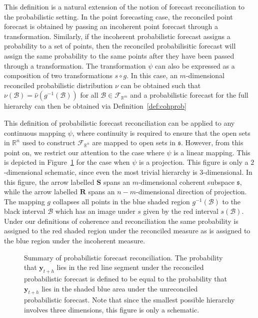 \documentclass[12pt]{article}
\theoremstyle{definition}
\begin{document}
This definition is a natural extension of the notion of forecast reconciliation to the probabilistic setting. In the point forecasting case, the reconciled point forecast is obtained by passing an incoherent point forecast through a transformation. Similarly, if the incoherent probabilistic forecast assigns a probability to a set of points, then the reconciled probabilisitic forecast will assign the same probability to the same points after they have been passed through a transformation.  The transformation $\psi$ can also be expressed as a composition of two transformations $s\circ g$.  In this case, an $m$-dimensional reconciled probabilistic distribution $\nu$ can be obtained such that $\nu(\mathcal{B})= \hat{\nu}(g^{-1}(\mathcal{B}))$ for all $\mathcal{B} \in \mathscr{F}_{\mathbb{R}^m}$ and a probabilistic forecast for the full hierarchy can then be obtained via Definition~\ref{def:cohprob}  

This definition of probabilistic forecast reconciliation can be applied to any continuous mapping $\psi$, where continuity is required to ensure that the open sets in $\mathbb{R}^n$ used to construct $\mathscr{F}_{\mathbb{R}^n}$ are mapped to open sets in $\mathfrak{s}$.  However, from this point on, we restrict our attention to the case where $\psi$ is a linear mapping.  This is depicted in Figure~\ref{fig:probfr_sch} for the case when $\psi$ is a projection.  This figure is only a $2$-dimensional schematic, since even the most trivial hierarchy is $3$-dimensional.  In this figure, the arrow labelled $\bm{S}$ spans an $m$-dimensional coherent subspace $\mathfrak{s}$, while the arrow labelled $\bm{R}$ spans an $n-m$-dimensional direction of projection.  The mapping $g$ collapses all points in the blue shaded region $g^{-1}(\mathcal{B})$ to the black interval $\mathcal{B}$ which has an image under $s$ given by the red interval $s(\mathcal{B})$.  Under our definitions of coherence and reconciliation the same probability is assigned to the red shaded region under the reconciled measure as is assigned to the blue region under the incoherent measure.

\begin{figure}
	
	\caption{Summary of probabilistic forecast reconciliation. The probability that $\bm{y}_{t+h}$ lies in the red line segment under the reconciled probabilistic forecast is defined to be equal to the probability that $\bm{y}_{t+h}$ lies in the shaded blue area under the unreconciled probabilistic forecast. Note that since the smallest possible hierarchy involves three dimensions, this figure is only a schematic.}\label{fig:probfr_sch}
\end{figure}
\end{document}
